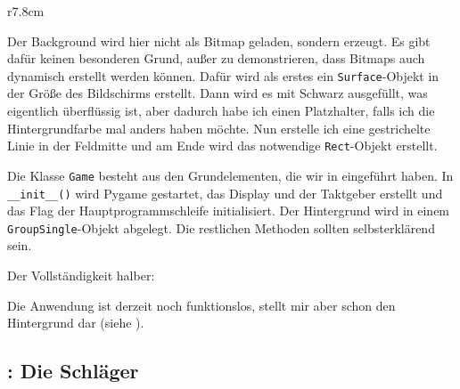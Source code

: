 
\begin{wrapfigure}[9]{r}{7.8cm}%
	\begin{center}%
		\vspace{-1cm}%
	\end{center}%
\end{wrapfigure}%
Der Background wird hier nicht als Bitmap geladen, sondern erzeugt. Es gibt dafür keinen besonderen Grund, außer zu demonstrieren, dass Bitmaps auch dynamisch erstellt werden können. Dafür wird als erstes ein \texttt{Surface}-Objekt in der Größe des Bildschirms erstellt. Dann wird es mit Schwarz ausgefüllt, was eigentlich überflüssig ist, aber dadurch habe ich einen Platzhalter, falls ich die Hintergrundfarbe mal anders haben möchte. Nun erstelle ich eine gestrichelte Linie in der Feldmitte und am Ende wird das notwendige \texttt{Rect}-Objekt erstellt.


Die Klasse \texttt{Game} besteht aus den Grundelementen, die wir in  eingeführt haben. In \texttt{\_\_init\_\_()} wird Pygame gestartet, das Display und der Taktgeber erstellt und das Flag der Hauptprogrammschleife initialisiert. Der Hintergrund wird in einem \texttt{Group\-Single}-Objekt abgelegt. Die restlichen Methoden sollten selbsterklärend sein.


Der Vollständigkeit halber: 


Die Anwendung ist derzeit noch funktionslos, stellt mir aber schon den Hintergrund dar (siehe ).

\subsection{: Die Schläger}

